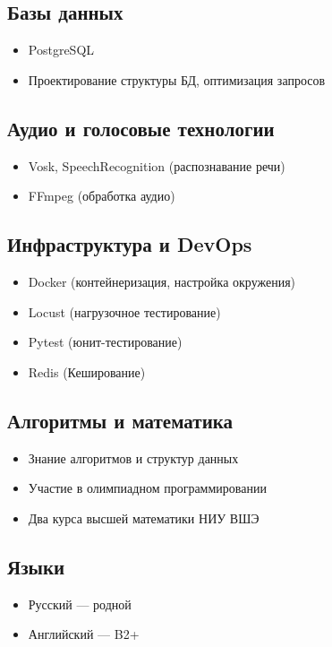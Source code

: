 \documentclass[a4paper,12pt]{article}
\begin{document}
	\subsection*{Базы данных}
	\begin{itemize}[leftmargin=1.5em]
		\item PostgreSQL
		\item Проектирование структуры БД, оптимизация запросов
	\end{itemize}
	
	\subsection*{Аудио и голосовые технологии}
	\begin{itemize}[leftmargin=1.5em]
		\item Vosk, SpeechRecognition (распознавание речи)
		\item FFmpeg (обработка аудио)
	\end{itemize}
	
	\subsection*{Инфраструктура и DevOps}
	\begin{itemize}[leftmargin=1.5em]
		\item Docker (контейнеризация, настройка окружения)
		\item Locust (нагрузочное тестирование)
		\item Pytest (юнит-тестирование)
		\item Redis (Кеширование)
	\end{itemize}
	
	\subsection*{Алгоритмы и математика}
	\begin{itemize}[leftmargin=1.5em]
		\item Знание алгоритмов и структур данных
		\item Участие в олимпиадном программировании
		\item Два курса высшей математики НИУ ВШЭ
	\end{itemize}
	
	\subsection*{Языки}
	\begin{itemize}[leftmargin=1.5em]
		\item Русский — родной
		\item Английский — B2+
	\end{itemize}
	
\end{document}
